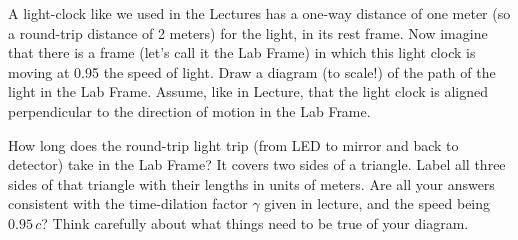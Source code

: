 \documentclass[12pt, letterpaper]{article}
\begin{document}
\begin{problem}
A light-clock like we used in the Lectures has a one-way distance of
one meter (so a round-trip distance of 2 meters) for the light, in its
rest frame. Now imagine that there is a frame (let's call it the Lab
Frame) in which this light clock is moving at 0.95 the speed of
light. Draw a diagram (to scale!) of the path of the light in the Lab
Frame. Assume, like in Lecture, that the light clock is aligned
perpendicular to the direction of motion in the Lab Frame.

How long does the round-trip light trip (from LED to mirror and back
to detector) take in the Lab Frame? It covers two sides of a
triangle. Label all three sides of that triangle with their lengths in
units of meters. Are all your answers consistent with the
time-dilation factor $\gamma$ given in lecture, and the speed being
$0.95\,c$? Think carefully about what things need to be true of your
diagram.
\end{problem}
\end{document}
